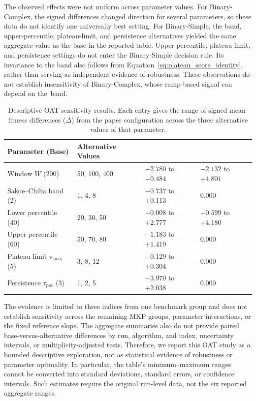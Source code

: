 \documentclass[mathematics,article,accept,moreauthors]{Definitions/mdpi}
\begin{document}
The observed effects were not uniform across parameter values. For
Binary-Complex, the signed differences changed direction for several
parameters, so these data do not identify one universally best setting. For
Binary-Simple, the band, upper-percentile, plateau-limit, and persistence
alternatives yielded the same aggregate value as the base in the reported
table. Upper-percentile, plateau-limit, and persistence settings do not
enter the Binary-Simple decision rule. Its invariance to the band also
follows from Equation~\eqref{eq:plateau_score_identity}, rather than serving
as independent evidence of robustness. These observations do not establish
insensitivity of Binary-Complex, whose ramp-based signal can depend on the~band.


\begin{table}[H]
  \small
  \caption{Descriptive OAT sensitivity results. Each entry gives the range of
  signed mean-fitness differences ($\Delta$) from the paper configuration
  across the three alternative values of that parameter.}
  \label{tab:oat_sensitivity}
  \begin{tabularx}{\textwidth}{LLLL}
    \toprule
    \textbf{Parameter (Base)} & \textbf{Alternative Values} & \textbf{} & \textbf{} \\
    \midrule
    Window $W$ (200) & 50, 100, 400 & $-2.780$ to $-0.484$ & $-2.132$ to $+4.801$ \\
    Sakoe--Chiba band (2) & 1, 4, 8 & $-0.737$ to $+0.113$ & $0.000$ \\
    Lower percentile (40) & 20, 30, 50 & $-0.008$ to $+2.777$ & $-0.599$ to $+4.180$ \\
    Upper percentile (60) & 50, 70, 80 & $-1.183$ to $+1.419$ & $0.000$ \\
    Plateau limit $\pi_{\max}$ (5) & 3, 8, 12 & $-0.129$ to $+0.304$ & $0.000$ \\
    Persistence $\tau_{\mathrm{pat}}$ (3) & 1, 2, 5 & $-3.970$ to $+2.038$ & $0.000$ \\
    \bottomrule
  \end{tabularx}
\end{table}



The evidence is limited to three indices from one benchmark group and does
not establish sensitivity across the remaining MKP groups, parameter
interactions, or the fixed reference slope. The aggregate summaries also do
not provide paired base-versus-alternative differences by run, algorithm,
and index, uncertainty intervals, or multiplicity-adjusted tests. Therefore,
we report this OAT study as a bounded descriptive exploration, not as
statistical evidence of robustness or parameter optimality. In particular,
the table's minimum--maximum ranges cannot be converted into standard
deviations, standard errors, or confidence intervals. Such estimates require
the original run-level data, not the six reported aggregate ranges.
\end{document}

